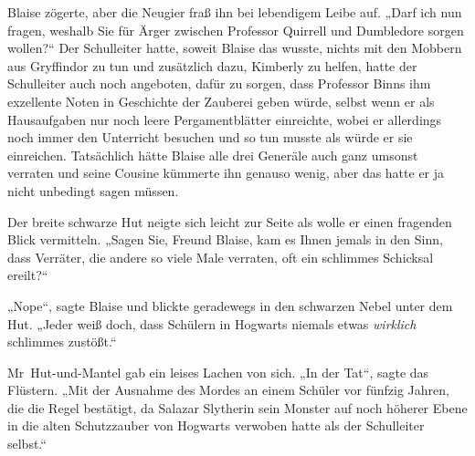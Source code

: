 Blaise zögerte, aber die Neugier fraß ihn bei lebendigem Leibe auf. „Darf ich nun fragen, weshalb Sie für Ärger zwischen Professor Quirrell und Dumbledore sorgen wollen?“ Der Schulleiter hatte, soweit Blaise das wusste, nichts mit den Mobbern aus Gryffindor zu tun und zusätzlich dazu, Kimberly zu helfen, hatte der Schulleiter auch noch angeboten, dafür zu sorgen, dass Professor Binns ihm exzellente Noten in Geschichte der Zauberei geben würde, selbst wenn er als Hausaufgaben nur noch leere Pergamentblätter einreichte, wobei er allerdings noch immer den Unterricht besuchen und so tun musste als würde er sie einreichen. Tatsächlich hätte Blaise alle drei Generäle auch ganz umsonst verraten und seine Cousine kümmerte ihn genauso wenig, aber das hatte er ja nicht unbedingt sagen müssen.

Der breite schwarze Hut neigte sich leicht zur Seite als wolle er einen fragenden Blick vermitteln. „Sagen Sie, Freund Blaise, kam es Ihnen jemals in den Sinn, dass Verräter, die andere so viele Male verraten, oft ein schlimmes Schicksal ereilt?“

„Nope“, sagte Blaise und blickte geradewegs in den schwarzen Nebel unter dem Hut. „Jeder weiß doch, dass Schülern in Hogwarts niemals etwas \emph{wirklich} schlimmes zustößt.“

Mr~Hut-und-Mantel gab ein leises Lachen von sich. „In der Tat“, sagte das Flüstern. „Mit der Ausnahme des Mordes an einem Schüler vor fünfzig Jahren, die die Regel bestätigt, da Salazar Slytherin sein Monster auf noch höherer Ebene in die alten Schutzzauber von Hogwarts verwoben hatte als der Schulleiter selbst.“

